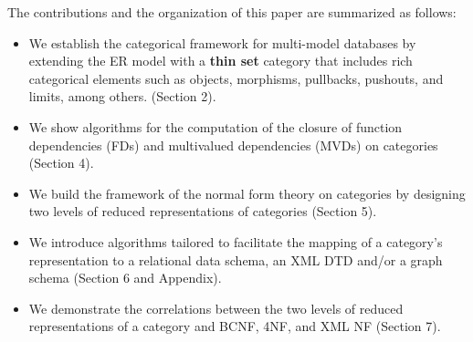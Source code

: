  
 


 
 

 The contributions and the organization of this paper are summarized as follows:

 \begin{itemize}
     \item We establish the categorical framework for multi-model databases by extending the ER model with a \textbf{thin set} category that includes rich categorical elements such as objects, morphisms, pullbacks, pushouts, and limits, among others. (Section 2).
     \item We show algorithms for the computation of the closure of function dependencies (FDs) and multivalued dependencies (MVDs) on categories  (Section 4).
     \item We build the framework of the normal form theory on categories by designing two levels of reduced representations of categories (Section 5).
     \item We introduce algorithms tailored to facilitate the mapping of a category's representation to a relational data schema, an XML DTD and/or a graph schema (Section 6 and Appendix).
     \item We demonstrate the correlations between the two levels of reduced representations of a category and BCNF, 4NF, and XML NF (Section 7).
     
 \end{itemize}
 
 


